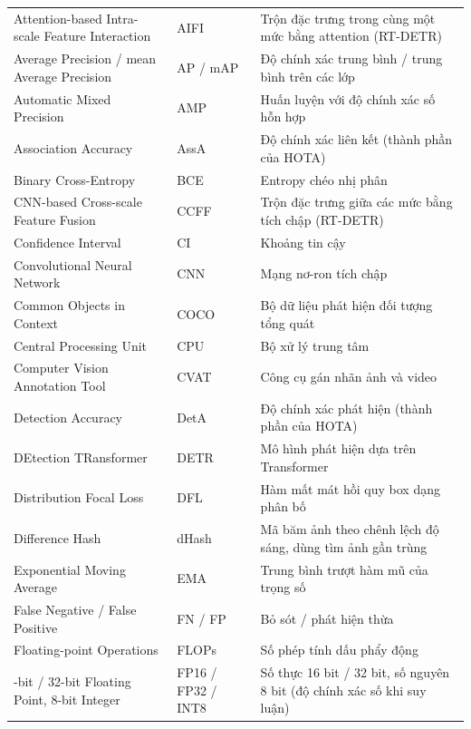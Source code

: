 
\begingroup
\small
\begin{longtable}{P{6.2cm}>{\centering\arraybackslash}p{2.3cm}P{5.2cm}}
\toprule
{} &  &  \\ \midrule
\endhead
Attention-based Intra-scale Feature Interaction & AIFI & Trộn đặc trưng trong cùng một mức bằng attention (RT-DETR) \\ \rowsep
Average Precision / mean Average Precision & AP / mAP & Độ chính xác trung bình / trung bình trên các lớp \\ \rowsep
Automatic Mixed Precision & AMP & Huấn luyện với độ chính xác số hỗn hợp \\ \rowsep
Association Accuracy & AssA & Độ chính xác liên kết (thành phần của HOTA) \\ \rowsep
Binary Cross-Entropy & BCE & Entropy chéo nhị phân \\ \rowsep
CNN-based Cross-scale Feature Fusion & CCFF & Trộn đặc trưng giữa các mức bằng tích chập (RT-DETR) \\ \rowsep
Confidence Interval & CI & Khoảng tin cậy \\ \rowsep
Convolutional Neural Network & CNN & Mạng nơ-ron tích chập \\ \rowsep
Common Objects in Context & COCO & Bộ dữ liệu phát hiện đối tượng tổng quát \\ \rowsep
Central Processing Unit & CPU & Bộ xử lý trung tâm \\ \rowsep
Computer Vision Annotation Tool & CVAT & Công cụ gán nhãn ảnh và video \\ \rowsep
Detection Accuracy & DetA & Độ chính xác phát hiện (thành phần của HOTA) \\ \rowsep
DEtection TRansformer & DETR & Mô hình phát hiện dựa trên Transformer \\ \rowsep
Distribution Focal Loss & DFL & Hàm mất mát hồi quy box dạng phân bố \\ \rowsep
Difference Hash & dHash & Mã băm ảnh theo chênh lệch độ sáng, dùng tìm ảnh gần trùng \\ \rowsep
Exponential Moving Average & EMA & Trung bình trượt hàm mũ của trọng số \\ \rowsep
False Negative / False Positive & FN / FP & Bỏ sót / phát hiện thừa \\ \rowsep
Floating-point Operations & FLOPs & Số phép tính dấu phẩy động \\ -bit / 32-bit Floating Point, 8-bit Integer & FP16 / FP32 / INT8 & Số thực 16 bit / 32 bit, số nguyên 8 bit (độ chính xác số khi suy luận)

\end{longtable}
